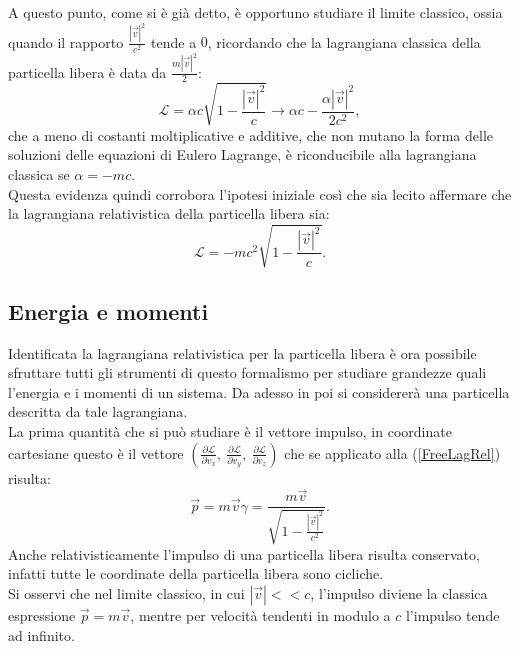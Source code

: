 A questo punto, come si è già detto, è opportuno studiare il limite classico, ossia quando il rapporto $\frac{|\vec{v}|^2}{c^2}$ tende a $0$, ricordando che la lagrangiana classica della particella libera è data da $\frac{m|\vec{v}|^2}{2} $:
\begin{equation*}
    \mathcal{L} =\alpha c \sqrt{1-\frac{|\vec{v}|^2}{c}}\longrightarrow \alpha c - \frac{\alpha |\vec{v}|^2}{2c^2},
\end{equation*}
che a meno di costanti moltiplicative e additive, che non mutano la forma delle soluzioni delle equazioni di Eulero Lagrange, è riconducibile alla lagrangiana classica se $\alpha=-mc$.\\
Questa evidenza quindi corrobora l'ipotesi iniziale così che sia lecito affermare che la lagrangiana relativistica della particella libera sia:
\begin{equation}\label{FreeLagRel}
    \mathcal{L} = -mc^2\sqrt{1-\frac{|\vec{v}|^2}{c}}.
\end{equation}
\subsection{Energia e momenti}
Identificata la lagrangiana relativistica per la particella libera è ora possibile sfruttare tutti gli strumenti di questo formalismo per studiare grandezze quali l'energia e i momenti di un sistema. Da adesso in poi si considererà una particella descritta da tale lagrangiana.\\

La prima quantità che si può studiare è il vettore impulso, in coordinate cartesiane questo è il vettore  $(\frac{\partial \mathcal{L} }{\partial v_x},\ \frac{\partial \mathcal{L} }{\partial v_y},\ \frac{\partial \mathcal{L} }{\partial v_z})$ che se applicato alla (\ref{FreeLagRel}) risulta:
\begin{equation}
    \vec{p}=m\vec{v}\gamma=\frac{m\vec{v}}{\sqrt{1-\frac{|\vec{v}|^2}{c^2}}}.
\end{equation}
Anche relativisticamente l'impulso di una particella libera risulta conservato, infatti tutte le coordinate della particella libera sono cicliche.\\
Si osservi che nel limite classico, in cui $|\vec{v}|<<c$, l'impulso diviene la classica espressione $\vec p=m\vec v$, mentre per velocità tendenti in modulo a $c$ l'impulso tende ad infinito.\\

